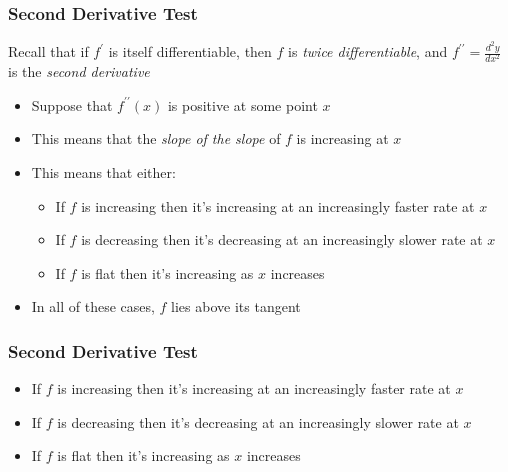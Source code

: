 \documentclass[aspectratio=169]{beamer}
\numberwithin{equation}{section}
\begin{document}
\begin{frame}
\frametitle{Second Derivative Test}

Recall that if $f^\prime$ is itself differentiable, then $f$ is \textit{twice differentiable}, and $f^{\prime\prime} = \frac{d^2y}{dx^2}$ is the \textit{second derivative} \pause

\begin{itemize}
\item Suppose that $f^{\prime\prime}(x)$ is positive at some point $x$ \pause
\item This means that the \textit{slope of the slope} of $f$ is increasing at $x$ \pause
\item This means that either:

\begin{itemize}

\item If $f$ is increasing then it's increasing at an increasingly faster rate at $x$ \pause
\item If $f$ is decreasing then it's decreasing at an increasingly slower rate at $x$ \pause
\item If $f$ is flat then it's increasing as $x$ increases \pause

\end{itemize}
\item In all of these cases, $f$ lies above its tangent
\end{itemize}

\end{frame}



\begin{frame}
\frametitle{Second Derivative Test}

\begin{itemize}

\item[A] If $f$ is increasing then it's increasing at an increasingly faster rate at $x$ \pause
\item[B] If $f$ is decreasing then it's decreasing at an increasingly slower rate at $x$ \pause
\item[C] If $f$ is flat then it's increasing as $x$ increases

\end{itemize}

\vspace{.2in}
\begin{center}
\end{center}

\end{frame}
\end{document}
